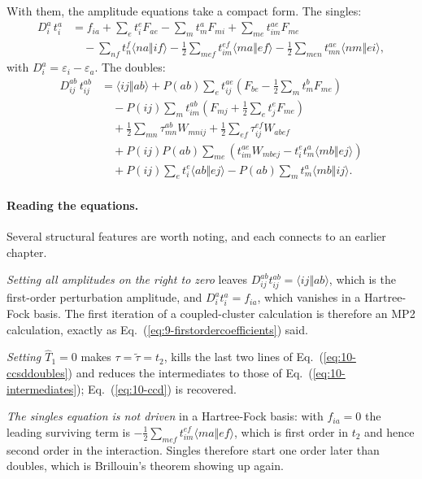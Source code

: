 With them, the amplitude equations take a compact form.  The singles:
\begin{align}
  D_i^a\,t_i^a
  &= f_{ia}
   + \sum_e t_i^e F_{ae}
   - \sum_m t_m^a F_{mi}
   + \sum_{me}t_{im}^{ae}F_{me}
  \nonumber\\
  &\quad
   - \sum_{nf}t_n^f\langle na\Vert if\rangle
   - \frac{1}{2}\sum_{mef}t_{im}^{ef}\langle ma\Vert ef\rangle
   - \frac{1}{2}\sum_{men}t_{mn}^{ae}\langle nm\Vert ei\rangle,
  \label{eq:10-ccsdsingles}
\end{align}
with $D_i^a=\varepsilon_i-\varepsilon_a$.  The doubles:
\begin{align}
  D_{ij}^{ab}\,t_{ij}^{ab}
  &= \langle ij\Vert ab\rangle
   + P(ab)\sum_e t_{ij}^{ae}
     \left(F_{be}-\tfrac12\sum_m t_m^b F_{me}\right)
  \nonumber\\
  &\quad
   - P(ij)\sum_m t_{im}^{ab}
     \left(F_{mj}+\tfrac12\sum_e t_j^e F_{me}\right)
  \nonumber\\
  &\quad
   + \frac{1}{2}\sum_{mn}\tau_{mn}^{ab}W_{mnij}
   + \frac{1}{2}\sum_{ef}\tau_{ij}^{ef}W_{abef}
  \nonumber\\
  &\quad
   + P(ij)P(ab)\sum_{me}\left(t_{im}^{ae}W_{mbej}
     - t_i^et_m^a\langle mb\Vert ej\rangle\right)
  \nonumber\\
  &\quad
   + P(ij)\sum_e t_i^e\langle ab\Vert ej\rangle
   - P(ab)\sum_m t_m^a\langle mb\Vert ij\rangle .
  \label{eq:10-ccsddoubles}
\end{align}

\paragraph{Reading the equations.}
Several structural features are worth noting, and each connects to an earlier
chapter.

\emph{Setting all amplitudes on the right to zero} leaves
$D_{ij}^{ab}t_{ij}^{ab}=\langle ij\Vert ab\rangle$, which is the first-order
perturbation amplitude, and $D_i^at_i^a=f_{ia}$, which vanishes in a
Hartree-Fock basis.  The first iteration of a coupled-cluster calculation is
therefore an MP2 calculation, exactly as
Eq.~(\ref{eq:9-firstordercoefficients}) said.

\emph{Setting $\hat{T}_1=0$} makes $\tau=\tilde\tau=t_2$, kills the last two
lines of Eq.~(\ref{eq:10-ccsddoubles}) and reduces the intermediates to those
of Eq.~(\ref{eq:10-intermediates}); Eq.~(\ref{eq:10-ccd}) is recovered.

\emph{The singles equation is not driven} in a Hartree-Fock basis: with
$f_{ia}=0$ the leading surviving term is
$-\tfrac12\sum_{mef}t_{im}^{ef}\langle ma\Vert ef\rangle$, which is first
order in $t_2$ and hence second order in the interaction.
Singles therefore start one order later than doubles, which is Brillouin's
theorem showing up again.

